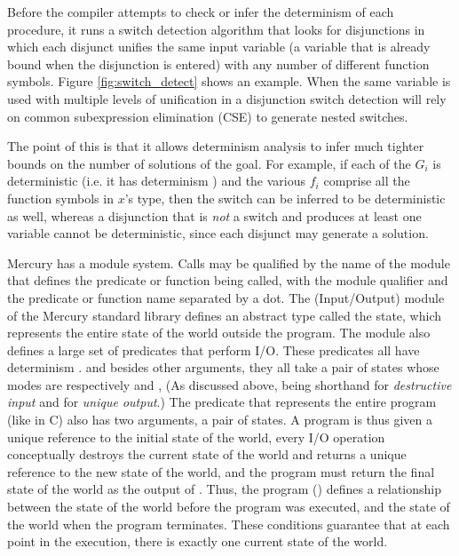 Before the compiler attempts to check or infer
the determinism of each procedure,
it runs a switch detection algorithm that looks for disjunctions
in which each disjunct unifies the same input variable
(a variable that is already bound when the disjunction is entered)
with any number of different function symbols.
Figure \ref{fig:switch_detect} shows an example.
When the same variable is used with multiple levels of unification in a
disjunction switch detection will rely on
common subexpression elimination (CSE)
to generate nested switches.

The point of this is that it allows determinism analysis
to infer much tighter bounds on the number of solutions of the goal.
For example, if each of the $G_i$ is deterministic
(i.e. it has determinism )
and the various $f_i$ comprise all the function symbols in $x$'s type,
then the switch can be inferred to be deterministic as well,
whereas a disjunction that is \emph{not} a switch and produces at least one
variable
cannot be deterministic,
since each disjunct may generate a solution.

Mercury has a module system.
Calls may be qualified by the name of the module
that defines the predicate or function being called,
with the module qualifier and the predicate or function name
separated by a dot.
The \io (Input/Output) module of the Mercury standard library
defines an abstract type called the \io state,
which represents the entire state of the world outside the program.
The \io module also defines a large set of predicates that perform I/O.
These predicates all have determinism .
and besides other arguments,
they all take a pair of \io states
whose modes are respectively \di and \uo,
(As discussed above, \di being shorthand for \emph{destructive input}
and \uo for \emph{unique output}.)
The  predicate that represents the entire program
(like  in C)
also has two arguments, a  pair of \io states.
A program is thus given
a unique reference to the initial state of the world,
every I/O operation conceptually destroys the current state of the world
and returns a unique reference to the new state of the world,
and the program must return the final state of the world
as the output of .
Thus, the program () defines a relationship between the state
of the world before the program was executed,
and the state of the world when the program terminates.
These conditions guarantee that at each point in the execution,
there is exactly one current state of the world.

